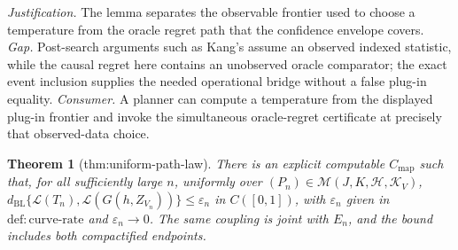 \documentclass{article}
\newtheorem{theorem}{Theorem}
\begin{document}
\par\smallskip\noindent \textit{Justification.} The lemma separates the observable frontier used to choose a temperature from the oracle regret path that the confidence envelope covers. \textit{Gap.} Post-search arguments such as Kang's assume an observed indexed statistic, while the causal regret here contains an unobserved oracle comparator; the exact event inclusion supplies the needed operational bridge without a false plug-in equality. \textit{Consumer.} A planner can compute a temperature from the displayed plug-in frontier and invoke the simultaneous oracle-regret certificate at precisely that observed-data choice.

\begin{theorem}[thm:uniform-path-law]\label{thm:uniform-path-law}
There is an explicit computable \(C_{\mathrm{map}}\) such that, for all sufficiently large \(n\), uniformly over \((P_n)\in\mathcal M(J,K,\mathcal H,\mathcal K_V)\), \(d_{\mathrm{BL}}\{\mathcal L(T_n),\mathcal L(G(h,Z_{V_n}))\}\le\varepsilon_n\) in \(C([0,1])\), with \(\varepsilon_n\) given in \(\mathrm{def:curve\mbox{-}rate}\) and \(\varepsilon_n\to0\). The same coupling is joint with \(E_n\), and the bound includes both compactified endpoints.
\end{theorem}
\end{document}
